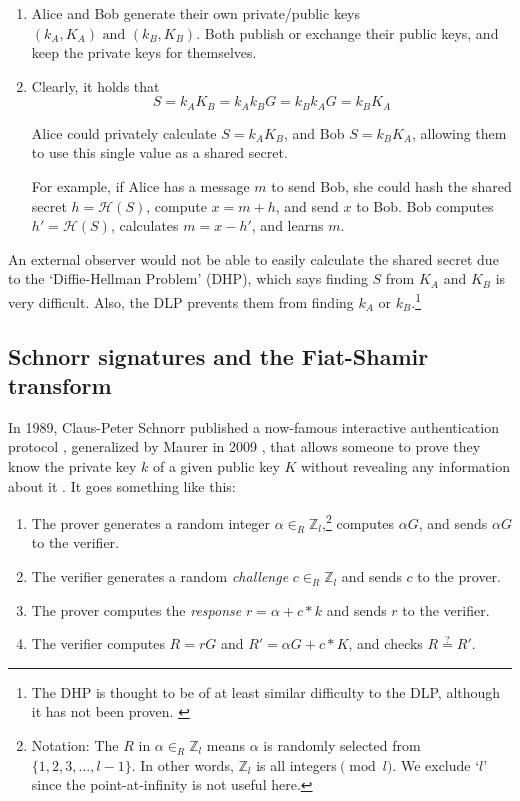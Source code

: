 \begin{enumerate}
	\item Alice and Bob generate their own private/public keys \((k_A, K_A) \textrm{ and } (k_B, K_B)\). Both publish or exchange their public keys, and keep the private keys for themselves.

	\item Clearly, it holds that \[S = k_A K_B = k_A k_B G = k_B k_A G = k_B K_A\]

	Alice could privately calculate \(S = k_A K_B\), and Bob \(S = k_B K_A\), allowing them to use this single value as a shared secret.

	For example, if Alice has a message $m$ to send Bob, she could hash the shared secret \(h = \mathcal{H}(S)\), compute $x = m + h$, and send $x$ to Bob. Bob computes $h' = \mathcal{H}(S)$, calculates $m = x - h'$, and learns $m$.
\end{enumerate}   

An external observer would not be able to easily calculate the shared secret due to the `Diffie-Hellman Problem' (DHP), which says finding $S$ from $K_A$ and $K_B$ is very difficult. Also, the DLP prevents them from finding $k_A$ or $k_B$.\footnote{The DHP is thought to be of at least similar difficulty to the DLP, although it has not been proven. \cite{galbraith-diffie-hellman-problem}}


\subsection{Schnorr signatures and the Fiat-Shamir transform}
\label{sec:schnorr-fiat-shamir}

In 1989, Claus-Peter Schnorr published a now-famous interactive authentication protocol \cite{schnorr-signatures}, generalized by Maurer in 2009 \cite{simple-zk-proof-maurer}, that allows someone to prove they know the private key $k$ of a given public key $K$ without revealing any information about it \cite{Signatures2015BorromeanRS}. It goes something like this:
\begin{enumerate}
	\item The prover generates a random integer \(\alpha \in_R \mathbb{Z}_l\),\footnote{\label{notation3_note}Notation: The $R$ in \(\alpha \in_R \mathbb{Z}_l\) means $\alpha$ is randomly selected from \(\{1,2,3,...,l-1\}\). In other words, $\mathbb{Z}_l$ is all integers$\pmod l$. We exclude `$l$' since the point-at-infinity is not useful here.} computes $\alpha G$, and sends $\alpha G$ to the verifier.
	\item The verifier generates a random {\em challenge} $c \in_R \mathbb{Z}_l$ and sends $c$ to the prover.
	\item The prover computes the {\em response} $r = \alpha + c*k$ and sends $r$ to the verifier.
	\item The verifier computes $R = r G$ and $R' = \alpha G + c*K$, and checks $R \stackrel{?}{=} R'$.
\end{enumerate}

